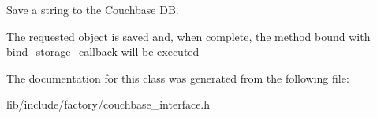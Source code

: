 Save a string to the Couchbase D\-B. 

The requested object is saved and, when complete, the method bound with bind\-\_\-storage\-\_\-callback will be executed 

The documentation for this class was generated from the following file\-:\begin{DoxyCompactItemize}
\item 
lib/include/factory/couchbase\-\_\-interface.\-h\end{DoxyCompactItemize}
